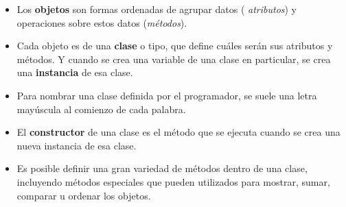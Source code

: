 \begin{itemize}
\item Los {\bf objetos} son formas ordenadas de agrupar datos ({\it
atributos}) y operaciones sobre estos datos ({\it métodos}).

\item Cada objeto es de una {\bf clase} o tipo, que define cuáles
serán sus atributos y métodos. Y cuando se crea una variable de una
clase en particular, se crea una {\bf instancia} de esa clase.

\item Para nombrar una clase definida por el programador, se suele una letra
mayúscula al comienzo de cada palabra.

\item El {\bf constructor} de una clase es el método que se ejecuta cuando
se crea una nueva instancia de esa clase.

\item Es posible definir una gran variedad de métodos dentro de una
clase, incluyendo métodos especiales que pueden utilizados para
mostrar, sumar, comparar u ordenar los objetos.
\end{itemize}


